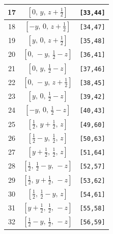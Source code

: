 \documentclass[fleqn,8pt]{jsarticle}
\begin{document}
\begin{longtable}{ccc}
17 & $\left[ 0,\, y,\, z + \frac{1}{2} \right]$ & {\tt [33,44]} \\ \hline
18 & $\left[ - y,\, 0,\, z + \frac{1}{2} \right]$ & {\tt [34,47]} \\ \hline
19 & $\left[ y,\, 0,\, z + \frac{1}{2} \right]$ & {\tt [35,48]} \\ \hline
20 & $\left[ 0,\, - y,\, \frac{1}{2} - z \right]$ & {\tt [36,41]} \\ \hline
21 & $\left[ 0,\, y,\, \frac{1}{2} - z \right]$ & {\tt [37,46]} \\ \hline
22 & $\left[ 0,\, - y,\, z + \frac{1}{2} \right]$ & {\tt [38,45]} \\ \hline
23 & $\left[ y,\, 0,\, \frac{1}{2} - z \right]$ & {\tt [39,42]} \\ \hline
24 & $\left[ - y,\, 0,\, \frac{1}{2} - z \right]$ & {\tt [40,43]} \\ \hline
25 & $\left[ \frac{1}{2},\, y + \frac{1}{2},\, z \right]$ & {\tt [49,60]} \\ \hline
26 & $\left[ \frac{1}{2} - y,\, \frac{1}{2},\, z \right]$ & {\tt [50,63]} \\ \hline
27 & $\left[ y + \frac{1}{2},\, \frac{1}{2},\, z \right]$ & {\tt [51,64]} \\ \hline
28 & $\left[ \frac{1}{2},\, \frac{1}{2} - y,\, - z \right]$ & {\tt [52,57]} \\ \hline
29 & $\left[ \frac{1}{2},\, y + \frac{1}{2},\, - z \right]$ & {\tt [53,62]} \\ \hline
30 & $\left[ \frac{1}{2},\, \frac{1}{2} - y,\, z \right]$ & {\tt [54,61]} \\ \hline
31 & $\left[ y + \frac{1}{2},\, \frac{1}{2},\, - z \right]$ & {\tt [55,58]} \\ \hline
32 & $\left[ \frac{1}{2} - y,\, \frac{1}{2},\, - z \right]$ & {\tt [56,59]} \\
\end{longtable}
\renewcommand{\arraystretch}{1.2}
\end{document}

